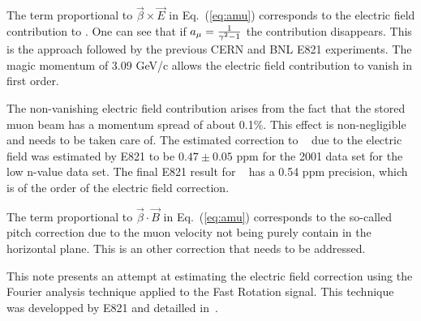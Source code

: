 The term proportional to ${\vec \beta \times \vec E }$ in Eq.~(\ref{eq:amu}) corresponds to the electric field contribution to \wa.
One can see that if $a_{\mu} = {1 \over \gamma^2 - 1}$ the contribution disappears. 
This is the approach followed by the previous CERN and BNL E821 experiments. 
The magic momentum of 3.09 GeV/c allows the electric field contribution to vanish in first order.

The non-vanishing electric field contribution arises from the fact that the stored muon beam has a momentum spread of about 0.1\%.
This effect is non-negligible and needs to be taken care of. The estimated correction to \wa~ due to the electric field was estimated
by E821 to be $0.47 \pm 0.05$ ppm for the 2001 data set for the low n-value data set. The final E821 result for \amu~ has a 0.54 ppm precision, which
is of the order of the electric field correction.

The term proportional to $\vec \beta \cdot \vec B$ in Eq.~(\ref{eq:amu}) corresponds to the so-called pitch correction due to the muon velocity not
being purely contain in the horizontal plane. This is an other correction that needs to be addressed.

This note presents an attempt at estimating the electric field correction using the Fourier analysis technique applied to the Fast Rotation signal. 
This technique was developped by E821 and detailled in~\cite{orlov}.
